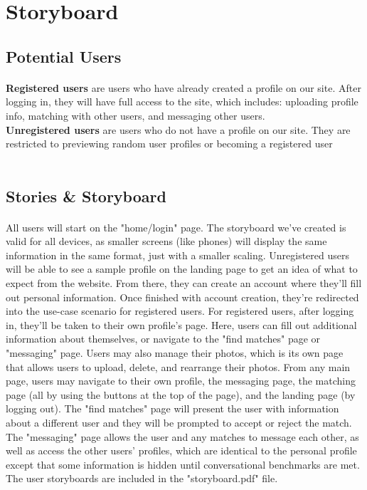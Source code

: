 \documentclass{article}
\begin{document}
    \section{Storyboard}
    \begin{enumerate}
        \subsection{Potential Users}
        \paragraph{}
        \textbf{Registered users} are users who have already created a profile on our site. After logging in, they will have full access to the site, which includes: uploading profile info, matching with other users, and messaging other users.\\
        \textbf{Unregistered users} are users who do not have a profile on our site. They are restricted to previewing random user profiles or becoming a registered user\\\\
        
        \subsection{Stories & Storyboard}
        \paragraph{}
        All users will start on the "home/login" page. The storyboard we've created is valid for all devices, as smaller screens (like phones) will display the same information in the same format, just with a smaller scaling. Unregistered users will be able to see a sample profile on the landing page to get an idea of what to expect from the website. From there, they can create an account where they'll fill out personal information. Once finished with account creation, they're redirected into the use-case scenario for registered users. For registered users, after logging in, they'll be taken to their own profile's page. Here, users can fill out additional information about themselves, or navigate to the "find matches" page or "messaging" page. Users may also manage their photos, which is its own page that allows users to upload, delete, and rearrange their photos. From any main page, users may navigate to their own profile, the messaging page, the matching page (all by using the buttons at the top of the page), and the landing page (by logging out). The "find matches" page will present the user with information about a different user and they will be prompted to accept or reject the match. The "messaging" page allows the user and any matches to message each other, as well as access the other users' profiles, which are identical to the personal profile except that some information is hidden until conversational benchmarks are met. The user storyboards are included in the "storyboard.pdf" file.
    \end{enumerate}
    
\end{document}
